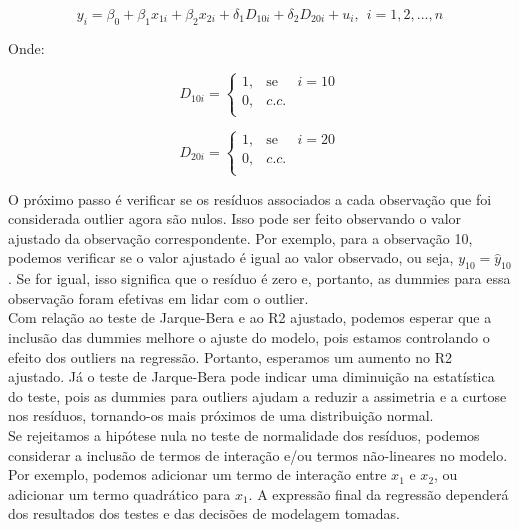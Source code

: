 \documentclass[a4paper, 12pt]{article}
\begin{document}
\begin{equation*}
    y_i = \beta_0 + \beta_1 x_{1i} + \beta_2 x_{2i} + \delta_1 D_{10i} + \delta_2 D_{20i} + u_i , \>\ i = 1, 2, ..., n
\end{equation*}

Onde:

\begin{equation*}
    D_{10i} = \left\{ \begin{array}{rcl}
            1, & \mbox{se} & i=10 \\ 
            0 , & c.c. \\
            \end{array}\right.
\end{equation*}

\begin{equation*}
    D_{20i} = \left\{ \begin{array}{rcl}
            1, & \mbox{se} & i=20 \\ 
            0 , & c.c. \\
            \end{array}\right.
\end{equation*}

O próximo passo é verificar se os resíduos associados a cada observação que foi considerada outlier agora são nulos. Isso pode ser feito observando o valor ajustado da observação correspondente. Por exemplo, para a observação 10, podemos verificar se o valor ajustado é igual ao valor observado, ou seja, $y_{10} = \hat{y}_{10}$. Se for igual, isso significa que o resíduo é zero e, portanto, as dummies para essa observação foram efetivas em lidar com o outlier.\\

Com relação ao teste de Jarque-Bera e ao R2 ajustado, podemos esperar que a inclusão das dummies melhore o ajuste do modelo, pois estamos controlando o efeito dos outliers na regressão. Portanto, esperamos um aumento no R2 ajustado. Já o teste de Jarque-Bera pode indicar uma diminuição na estatística do teste, pois as dummies para outliers ajudam a reduzir a assimetria e a curtose nos resíduos, tornando-os mais próximos de uma distribuição normal.\\

Se rejeitamos a hipótese nula no teste de normalidade dos resíduos, podemos considerar a inclusão de termos de interação e/ou termos não-lineares no modelo. Por exemplo, podemos adicionar um termo de interação entre $x_1$ e $x_2$, ou adicionar um termo quadrático para $x_1$. A expressão final da regressão dependerá dos resultados dos testes e das decisões de modelagem tomadas.\\ 
\end{document}
